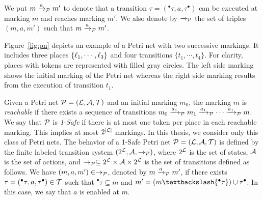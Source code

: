We put $m\xrightarrow{a}_{\mathcal{P}}m'$ to denote that a transition $\tau=({^\bullet\tau},a,
  \tau^\bullet)$ can be executed at marking $m$ and reaches marking $m'$. 
  We also denote by $\xrightarrow{}_{\mathcal{P}}$
the set of triples $(m,a,m')$ such that $m\xrightarrow{a}_{\mathcal{P}}m'$.
  
\begin{example}
  Figure~\ref{fig:pn} depicts an example of a Petri net with two successive markings. It includes
  three places $\{\ell_1,\cdots,\ell_3\}$ and four transitions $\{t_1,\cdots,t_4\}$. For clarity,
  places with tokens are represented with filled gray circles. The left side marking 
  shows the initial marking of the Petri net whereas the right side marking results from the
  execution of transition $t_1$.
\end{example}

Given a Petri net $\mathcal{P}=(\mathcal{L},\mathcal{A},\mathcal{T})$ and an initial marking $m_0$, the marking $m$
is \emph{reachable} if there exists a sequence of transitions $m_0\xrightarrow{a_1}_{\mathcal{P}}m_1
\xrightarrow{a_1}_{\mathcal{P}}\cdots\xrightarrow{a_1}_{\mathcal{P}}m$. We say that $\mathcal{P}$ is \emph{1-Safe}
if there is at most one token per place in each reachable marking. This implies at most
$2^{|\mathcal{L}|}$ markings. In this thesis, we consider only this class of Petri nets.
The behavior of a 1-Safe Petri net  $\mathcal{P}=(\mathcal{L},\mathcal{A},\mathcal{T})$ is defined by the finite
labeled transition system $(2^{\mathcal{L}},\mathcal{A},\to_{\mathcal{P}})$, where $2^{\mathcal{L}}$ is the set of
states, $\mathcal{A}$ is the set of actions, and $\to_{\mathcal{P}}\subseteq 2^{\mathcal{L}}\times\mathcal{A}\times
2^{\mathcal{L}}$ is the set of transitions defined as follows. We have $(m,a,m')\in\to_{\mathcal{P}}$, 
denoted by $m\xrightarrow{a}_{\mathcal{P}}m'$, if there exists $\tau=({^\bullet\tau},a,{\tau^\bullet })
  \in\mathcal{T}$ such that ${^\bullet\tau}\subseteq m$ and $m'=(m\textbackslash{^\bullet\tau})
  \cup{\tau^\bullet }$.
In this case, we say that $a$ is enabled at $m$.

